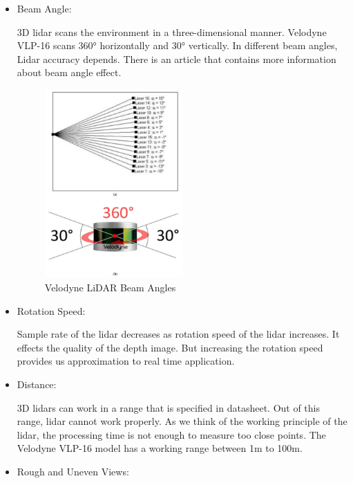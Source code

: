 \documentclass[12pt]{article}
\begin{document}
\begin{itemize}
    \item Beam Angle:
          
          3D lidar scans the environment in a three-dimensional manner. Velodyne VLP-16 scans 360° horizontally and 30° vertically. In different beam angles, Lidar accuracy depends. There is an article that contains more information about beam angle effect.
          
          \begin{figure}[H]
              \centering
              \includegraphics[width=0.5\textwidth]{LidarAngles.jpeg}
              \caption{Velodyne LiDAR Beam Angles~\cite{VelodynePerformance}}
          \end{figure}
          
    \item Rotation Speed:
          
          Sample rate of the lidar decreases as rotation speed of the lidar increases. It effects the quality of the depth image. But increasing the rotation speed provides us approximation to real time application.
          
    \item Distance:
          
          3D lidars can work in a range that is specified in datasheet. Out of this range, lidar cannot work properly. As we think of the working principle of the lidar, the processing time is not enough to measure too close points. The Velodyne VLP-16 model has a working range between 1m to 100m.
          
    \item Rough and Uneven Views:
          

\end{itemize}
\end{document}
